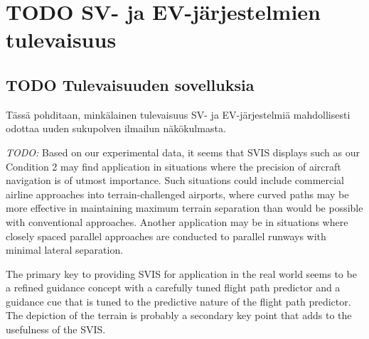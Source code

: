 \documentclass[utf8,bachelor,manualbib]{gradu3}
\begin{document}
\chapter{TODO SV- ja EV-järjestelmien tulevaisuus}

\section{TODO Tulevaisuuden sovelluksia}

Tässä pohditaan, minkälainen tulevaisuus SV- ja EV-järjestelmiä mahdollisesti odottaa uuden sukupolven ilmailun näkökulmasta.

\emph{TODO:}
Based on our experimental data, it seems that SVIS displays such as our Condition
2 may find application in situations where the precision of aircraft navigation is of
utmost importance. Such situations could include commercial airline approaches
into terrain-challenged airports, where curved paths may be more effective in
maintaining maximum terrain separation than would be possible with conventional
approaches. Another application may be in situations where closely spaced
parallel approaches are conducted to parallel runways with minimal lateral separation. \citep{schnellym2004}

The primary key to
providing SVIS for application in the real world seems to be a refined guidance
concept with a carefully tuned flight path predictor and a guidance cue that is tuned
to the predictive nature of the flight path predictor. The depiction of the terrain is
probably a secondary key point that adds to the usefulness of the SVIS. \citep{schnellym2004}
\end{document}
